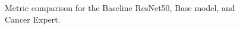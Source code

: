 \begin{figure}[htbp]
    \centering
    
    \caption{Metric comparison for the Baseline ResNet50, Base
    model, and Cancer Expert.}
    \label{fig:results-metric-comparison}
\end{figure}
